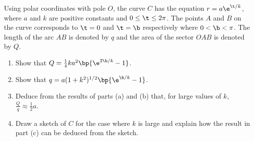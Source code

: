 \begin{problem}
    Using polar coordinates with pole $O$, the curve $C$ has the equation $r = a\e^{\t/k}$, where $a$ and $k$ are positive constants and $0 \leq \t \leq 2\pi$. The points $A$ and $B$ on the curve corresponds to $\t = 0$ and $\t = \b$ respectively where $0 < \b < \pi$. The length of the arc $AB$ is denoted by $q$ and the area of the sector $OAB$ is denoted by $Q$.

    \begin{enumerate}
        \item Show that $Q = \frac14 k a^2 \bp{\e^{2\b/k} - 1}$.
        \item Show that $q = a(1 + k^2)^{1/2}\bp{\e^{\b/k} - 1}$.
        \item Deduce from the results of parts (a) and (b) that, for large values of $k$, $\frac{Q}{q} \approx \frac12 a$.
        \item Draw a sketch of $C$ for the case where $k$ is large and explain how the result in part (c) can be deduced from the sketch.
    \end{enumerate}
\end{problem}
